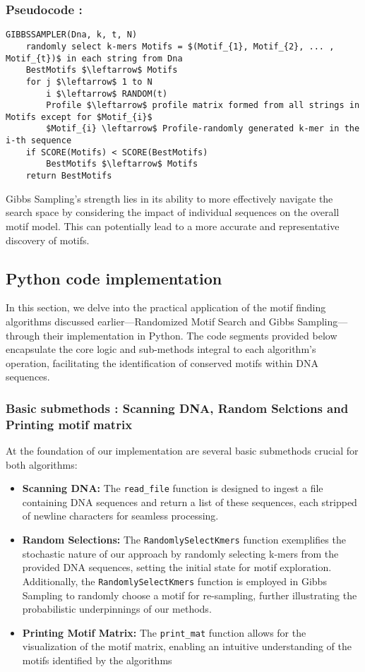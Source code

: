 \subsubsection{Pseudocode :}

\begin{lstlisting}[caption=Pseudocode for Gibbs Sampling, mathescape=true]
GIBBSSAMPLER(Dna, k, t, N)
    randomly select k-mers Motifs = $(Motif_{1}, Motif_{2}, ... , Motif_{t})$ in each string from Dna
    BestMotifs $\leftarrow$ Motifs
    for j $\leftarrow$ 1 to N
        i $\leftarrow$ RANDOM(t)
        Profile $\leftarrow$ profile matrix formed from all strings in Motifs except for $Motif_{i}$
        $Motif_{i} \leftarrow$ Profile-randomly generated k-mer in the i-th sequence
    if SCORE(Motifs) < SCORE(BestMotifs)
        BestMotifs $\leftarrow$ Motifs
    return BestMotifs
\end{lstlisting}
Gibbs Sampling's strength lies in its ability to more effectively navigate the search space by considering the impact of individual sequences on the overall motif model. This can potentially lead to a more accurate and representative discovery of motifs.

\subsection{Python code implementation}
In this section, we delve into the practical application of the motif finding algorithms discussed earlier—Randomized Motif Search and Gibbs Sampling—through their implementation in Python. The code segments provided below encapsulate the core logic and sub-methods integral to each algorithm's operation, facilitating the identification of conserved motifs within DNA sequences.
\subsubsection{Basic submethods : Scanning DNA, Random Selctions and Printing motif matrix}
At the foundation of our implementation are several basic submethods crucial for both algorithms:
\begin{itemize}
    \item \textbf{Scanning DNA: } The \texttt{read\_file} function is designed to ingest a file containing DNA sequences and return a list of these sequences, each stripped of newline characters for seamless processing.
    \item \textbf{Random Selections:} The \texttt{RandomlySelectKmers} function exemplifies the stochastic nature of our approach by randomly selecting k-mers from the provided DNA sequences, setting the initial state for motif exploration. Additionally, the \texttt{RandomlySelectKmers} function is employed in Gibbs Sampling to randomly choose a motif for re-sampling, further illustrating the probabilistic underpinnings of our methods.
    \item \textbf{Printing Motif Matrix:} The \texttt{print\_mat} function allows for the visualization of the motif matrix, enabling an intuitive understanding of the motifs identified by the algorithms
\end{itemize}

